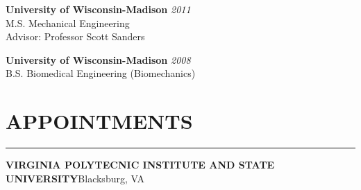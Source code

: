 \documentclass[11pt,letterpaper]{article}
\begin{document}
\vspace{3mm}
\begin{minipage}{0.45\columnwidth}
{\bf University of Wisconsin-Madison} \hfill {\em2011} \\ 
\hspace{5mm} M.S. Mechanical Engineering \\
\hspace{10mm} Advisor: Professor Scott Sanders\\
\end{minipage}%
\hfill
\begin{minipage}{0.5\columnwidth}
{\bf University of Wisconsin-Madison} \hfill {\em2008} \\ 
\hspace{5mm}B.S. Biomedical Engineering (Biomechanics)
\end{minipage}


\section*{APPOINTMENTS}\vspace{-3mm}
\hrule
\MakeUppercase{\bf Virginia Polytecnic Institute and State University}\hfill{Blacksburg, VA }\\
\end{document}
